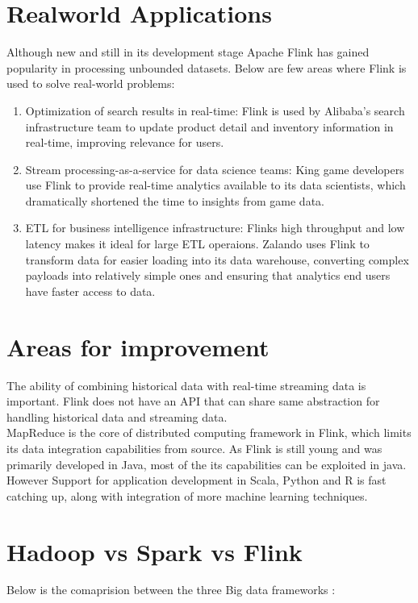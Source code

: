 \section{Realworld Applications}
Although new and still in its development stage Apache Flink has gained popularity in processing unbounded datasets. Below are few areas where Flink is used to solve real-world problems:
\begin{enumerate}\item Optimization of search results in real-time: Flink is used by Alibaba's search infrastructure team to update product detail and inventory information in real-time, improving relevance for users.
\item Stream processing-as-a-service for data science teams: King game developers use Flink to provide real-time analytics available to its data scientists, which dramatically shortened the time to insights from game data.
\item ETL for business intelligence infrastructure: Flinks high throughput and low latency makes it ideal for large ETL operaions. Zalando uses Flink to transform data for easier loading into its data warehouse, converting complex payloads into relatively simple ones and ensuring that analytics end users have faster access to data.~\cite{[link9]} \end{enumerate}
\section{Areas for improvement}
The ability of combining historical data with real-time streaming data is important. Flink does not have an API that can share same abstraction for handling historical data and streaming data.~\cite{[3]}\\
MapReduce is the core of distributed computing framework in Flink, which limits its data integration capabilities from source.
As Flink is still young and was primarily developed in Java, most of the its capabilities can be exploited in java. However Support for application development in Scala, Python and R is fast catching up, along with integration of more machine learning techniques. 

\section{Hadoop vs Spark vs Flink}

Below is the comaprision between the three Big data frameworks :

